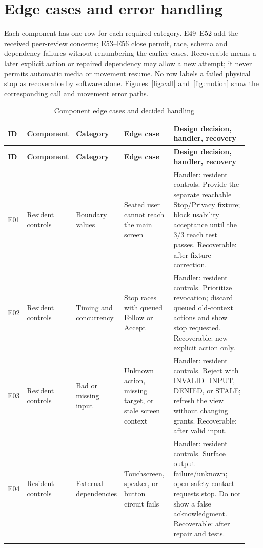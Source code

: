 \documentclass[12pt,letterpaper]{article}
\begin{document}
\section{Edge cases and error handling}
Each component has one row for each required category. E49--E52 add the received peer-review concerns; E53--E56 close permit, race, schema and dependency failures without renumbering the earlier cases. Recoverable means a later explicit action or repaired dependency may allow a new attempt; it never permits automatic media or movement resume. No row labels a failed physical stop as recoverable by software alone. Figures~\ref{fig:call} and~\ref{fig:motion} show the corresponding call and movement error paths.

\begingroup\small
\begin{longtable}{@{}>{\RaggedRight\arraybackslash}p{0.065\linewidth}>{\RaggedRight\arraybackslash}p{0.15\linewidth}>{\RaggedRight\arraybackslash}p{0.14\linewidth}>{\RaggedRight\arraybackslash}p{0.22\linewidth}>{\RaggedRight\arraybackslash}p{0.355\linewidth}@{}}
\caption{Component edge cases and decided handling}\\
\toprule\textbf{ID} & \textbf{Component} & \textbf{Category} & \textbf{Edge case} & \textbf{Design decision, handler, recovery}\\\midrule\endfirsthead
\toprule\textbf{ID} & \textbf{Component} & \textbf{Category} & \textbf{Edge case} & \textbf{Design decision, handler, recovery}\\\midrule\endhead
\midrule\endfoot\bottomrule\endlastfoot
E01 & Resident controls & Boundary values & Seated user cannot reach the main screen & Handler: resident controls. Provide the separate reachable Stop/Privacy fixture; block usability acceptance until the 3/3 reach test passes. Recoverable: after fixture correction. \\ \addlinespace[3pt]
E02 & Resident controls & Timing and concurrency & Stop races with queued Follow or Accept & Handler: resident controls. Prioritize revocation; discard queued old-context actions and show stop requested. Recoverable: new explicit action only. \\ \addlinespace[3pt]
E03 & Resident controls & Bad or missing input & Unknown action, missing target, or stale screen context & Handler: resident controls. Reject with INVALID\_\allowbreak{}INPUT, DENIED, or STALE; refresh the view without changing grants. Recoverable: after valid input. \\ \addlinespace[3pt]
E04 & Resident controls & External dependencies & Touchscreen, speaker, or button circuit fails & Handler: resident controls. Surface output failure/unknown; open safety contact requests stop. Do not show a false acknowledgment. Recoverable: after repair and tests. \\ \addlinespace[3pt]

\end{longtable}
\end{document}
